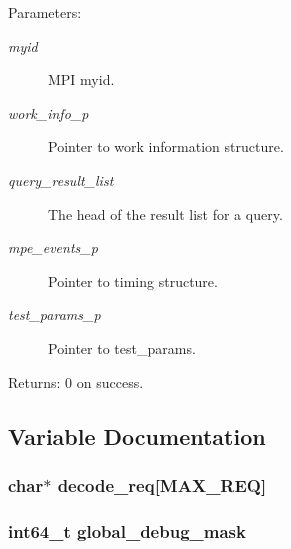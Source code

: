 \begin{Desc}
\item[Parameters:]
\begin{description}
\item[{\em myid}]MPI myid. \item[{\em work\_\-info\_\-p}]Pointer to work information structure. \item[{\em query\_\-result\_\-list}]The head of the result list for a query. \item[{\em mpe\_\-events\_\-p}]Pointer to timing structure. \item[{\em test\_\-params\_\-p}]Pointer to test\_\-params. \end{description}
\end{Desc}
\begin{Desc}
\item[Returns:]0 on success. \end{Desc}


\subsection{Variable Documentation}
\subsubsection{\setlength{\rightskip}{0pt plus 5cm}char$\ast$ \bf{decode\_\-req}[MAX\_\-REQ]}\label{worker__help_8h_b8304f1191eac06a2fd04538b0249528}


\subsubsection{\setlength{\rightskip}{0pt plus 5cm}int64\_\-t \bf{global\_\-debug\_\-mask}}\label{worker__help_8h_1931c00ae0b7104d5c1c7473116ae1e4}


